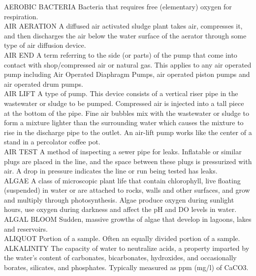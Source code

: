 AEROBIC BACTERIA
Bacteria that requires free (elementary) oxygen for respiration.
\vspace{0.3cm}\\
AIR AERATION
A diffused air activated sludge plant takes air, compresses it, and then discharges the air below the water surface of the aerator through some type of air diffusion device.
\vspace{0.3cm}\\
AIR END
A term referring to the side (or parts) of the pump that come into contact with shop/compressed air or natural gas. This applies to any air operated pump including Air Operated Diaphragm Pumps, air operated piston pumps and air operated drum pumps.
\vspace{0.3cm}\\
AIR LIFT
A type of pump. This device consists of a vertical riser pipe in the wastewater or sludge to be pumped. Compressed air is injected into a tall piece at the bottom of the pipe.   Fine air bubbles mix with the wastewater or sludge to form a mixture lighter than the surrounding water which causes the mixture to rise in the discharge pipe to the outlet. An air-lift pump works like the center of a stand in a percolator coffee pot.
\vspace{0.3cm}\\
AIR TEST
A method of inspecting a sewer pipe for leaks. Inflatable or similar plugs are placed in the line, and the space between these plugs is pressurized with air. A drop in pressure indicates the line or run being tested has leaks. 
\vspace{0.3cm}\\
ALGAE
A class of microscopic plant life that contain chlorophyll, live floating (suspended) in water or are attached to rocks, walls and other surfaces, and grow and multiply through photosynthesis. Algae produce oxygen during sunlight hours, use oxygen during darkness and affect the pH and DO levels in water.
\vspace{0.3cm}\\
ALGAL BLOOM
Sudden, massive growths of algae that develop in lagoons, lakes and reservoirs.
\vspace{0.3cm}\\
ALIQUOT
Portion of a sample. Often an equally divided portion of a sample.
\vspace{0.3cm}\\
ALKALINITY
The capacity of water to neutralize acids, a property imparted by the water’s content of carbonates, bicarbonates, hydroxides, and occasionally borates, silicates, and phosphates.  Typically measured as ppm (mg/l) of CaCO3.
